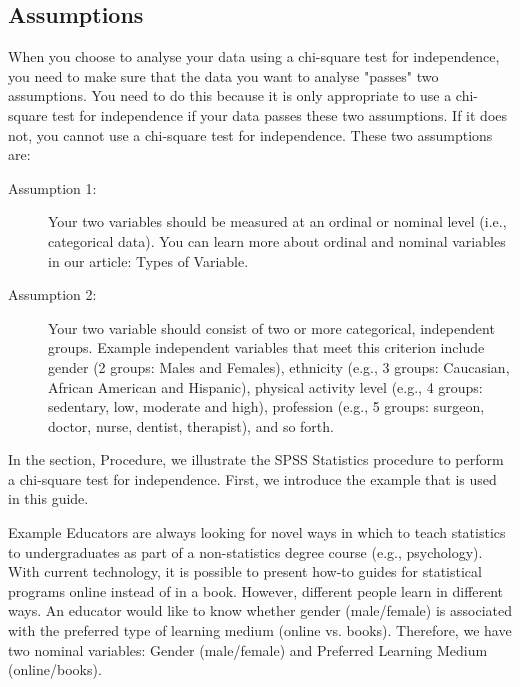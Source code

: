 
\subsection{Assumptions}
When you choose to analyse your data using a chi-square test for independence, you need to make sure that the data you want to analyse "passes" two assumptions. You need to do this because it is only appropriate to use a chi-square test for independence if your data passes these two assumptions. If it does not, you cannot use a chi-square test for independence. These two assumptions are:
\begin{description}
\item[Assumption 1:] Your two variables should be measured at an ordinal or nominal level (i.e., categorical data). You can learn more about ordinal and nominal variables in our article: Types of Variable.
\item[Assumption 2:] Your two variable should consist of two or more categorical, independent groups. Example independent variables that meet this criterion include gender (2 groups: Males and Females), ethnicity (e.g., 3 groups: Caucasian, African American and Hispanic), physical activity level (e.g., 4 groups: sedentary, low, moderate and high), profession (e.g., 5 groups: surgeon, doctor, nurse, dentist, therapist), and so forth.

\end{description}
In the section, Procedure, we illustrate the SPSS Statistics procedure to perform a chi-square test for independence. First, we introduce the example that is used in this guide.



Example
Educators are always looking for novel ways in which to teach statistics to undergraduates as part of a non-statistics degree course (e.g., psychology). With current technology, it is possible to present how-to guides for statistical programs online instead of in a book. However, different people learn in different ways. An educator would like to know whether gender (male/female) is associated with the preferred type of learning medium (online vs. books). Therefore, we have two nominal variables: Gender (male/female) and Preferred Learning Medium (online/books).



